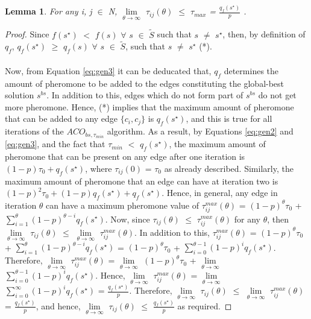 \documentclass[12pt]{article}
\newtheorem{lemma}[definition]{Lemma}
\numberwithin{equation}{subsection}
\numberwithin{table}{subsection}
\numberwithin{algorithm}{subsection}
\numberwithin{figure}{subsection}
\begin{document}
\begin{lemma}
\label{lemma1_aco}
 For any i, j $\in$ {\normalfont{[}}N{\normalfont{]}}, $\lim\limits_{\theta\to\infty}$ $\tau_{ij}(\theta)$ $\leq$ $\tau_{max}$ = $\frac{q_f(s^\star)}{p}$ {}.
\end{lemma}
\begin{proof}
Since $f(s^\star)$ $<$ $f(s)$ $\forall$ $s$ $\in$ $\widetilde{S}$ such that $s$ $\neq$ $s^\star$, then, by definition of $q_f$, $q_f(s^\star)$ $\geq$ $q_f(s)$ $\forall$ $s$ $\in$ $\widetilde{S}$, such that $s$ $\neq$ $s^\star$ (*).
\\\\ Now, from Equation \ref{eq:gen3} it can be deducated that, $q_f$ determines the amount of pheromone to be added to the edges constituting the global-best solution $s^{bs}$. In addition to this, edges which do not form part of $s^{bs}$ do not get more pheromone. Hence, (*) implies that the maximum amount of pheromone that can be added to any edge $\{c_i, c_j\}$ is $q_f(s^\star)$, and this is true for all iterations of the $ACO_{bs, \tau_{min}}$ algorithm. As a result, by Equations \ref{eq:gen2} and \ref{eq:gen3}, and the fact that $\tau_{min}$ $<$ $q_f(s^\star)$, the maximum amount of pheromone that can be present on any edge after one iteration is $(1-p)\tau_0 + q_f(s^\star)$, where $\tau_{ij}(0)$ = $\tau_0$ as already described. Similarly, the maximum amount of pheromone that an edge can have at iteration two is $(1-p)^2\tau_0 + (1-p)q_f(s^\star) + q_f(s^\star)$. Hence, in general, any edge in iteration $\theta$ can have a maximum pheromone value of $\tau_{ij}^{max}(\theta)$ =  $(1-p)^\theta\tau_0$ + $\sum_{i=1}^{\theta} (1-p)^{\theta-i}q_f(s^\star)$. Now, since $\tau_{ij}(\theta)$ $\leq$ $\tau_{ij}^{max}(\theta)$ for any $\theta$, then  $\lim\limits_{\theta\to\infty}$ $\tau_{ij}(\theta)$ $\leq$  $\lim\limits_{\theta\to\infty}$ $\tau_{ij}^{max}(\theta)$. In addition to this, $\tau_{ij}^{max}(\theta)$ = $(1-p)^\theta\tau_0$ + $\sum_{i=1}^{\theta} (1-p)^{\theta-i}q_f(s^\star)$ = $(1-p)^\theta\tau_0$ + $\sum_{i=0}^{\theta-1} (1-p)^{i}q_f(s^\star)$. Therefore, $\lim\limits_{\theta\to\infty}$ $\tau_{ij}^{max}(\theta)$ = $\lim\limits_{\theta\to\infty}$ $(1-p)^\theta\tau_0$ + $\lim\limits_{\theta\to\infty}$ $\sum_{i=0}^{\theta-1} (1-p)^{i}q_f(s^\star)$. Hence, $\lim\limits_{\theta\to\infty}$ $\tau_{ij}^{max}(\theta)$ = $\lim\limits_{\theta\to\infty}$ $\sum_{i=0}^{\infty} (1-p)^{i}q_f(s^\star)$ = $\frac{q_f(s^\star)}{p}$. Therefore,  $\lim\limits_{\theta\to\infty}$ $\tau_{ij}(\theta)$ $\leq$  $\lim\limits_{\theta\to\infty}$ $\tau_{ij}^{max}(\theta)$ = $\frac{q_f(s^\star)}{p}$, and hence, $\lim\limits_{\theta\to\infty}$ $\tau_{ij}(\theta)$ $\leq$ $\frac{q_f(s^\star)}{p}$ as required.
\end{proof}
\end{document}
